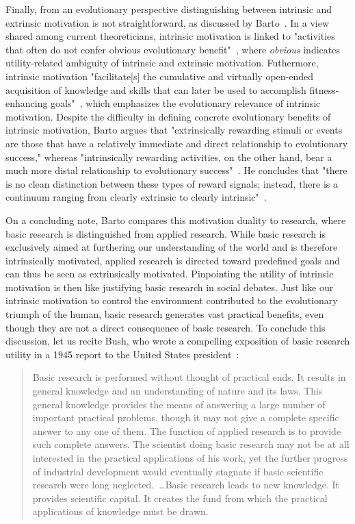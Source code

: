 \documentclass[a4paper]{scrreprt}
\begin{document}
Finally, from an evolutionary perspective distinguishing between intrinsic and extrinsic motivation is not straightforward, as discussed by Barto~\cite{barto13}. In a view shared among current theoreticians, intrinsic motivation is linked to "activities that often do not confer obvious evolutionary benefit"~\cite{baldassarre14}, where \textit{obvious} indicates utility-related ambiguity of intrinsic and extrinsic motivation. Futhermore, intrinsic motivation "facilitate[s] the cumulative and virtually open-ended acquisition of knowledge and skills that can later be used to accomplish fitness-enhancing goals"~\cite{baldassarre14}, which emphasizes the evolutionary relevance of intrinsic motivation. Despite the difficulty in defining concrete evolutionary benefits of intrinsic motivation, Barto argues that "extrinsically rewarding stimuli or events are those that have a relatively immediate and direct relationship to evolutionary success," whereas "intrinsically rewarding activities, on the other hand, bear a much more distal relationship to evolutionary success"~\cite{barto13}. He concludes that "there is no clean distinction between these types of reward signals; instead, there is a continuum ranging from clearly extrinsic to clearly intrinsic"~\cite{barto13}. 

On a concluding note, Barto compares this motivation duality to research, where basic research is distinguished from applied research. While basic research is exclusively aimed at furthering our understanding of the world and is therefore intrinsically motivated, applied research is directed toward predefined goals and can thus be seen as extrinsically motivated. Pinpointing the utility of intrinsic motivation is then like justifying basic research in social debates. Just like our intrinsic motivation to control the environment contributed to the evolutionary triumph of the human, basic research generates vast practical benefits, even though they are not a direct consequence of basic research. To conclude this discussion, let us recite Bush, who wrote a compelling exposition of basic research utility in a 1945 report to the United States president~\cite{bush45}:

\begin{quote}
Basic research is performed without thought of practical ends. It results in general knowledge and an understanding of nature and its laws. This general knowledge provides the means of answering a large number of important practical problems, though it may not give a complete specific answer to any one of them. The function of applied research is to provide such complete answers. The scientist doing basic research may not be at all interested in the practical applications of his work, yet the further progress of industrial development would eventually stagnate if basic scientific research were long neglected.~\dots Basic research leads to new knowledge. It provides scientific capital. It creates the fund from which the practical applications of knowledge must be drawn.
\end{quote}
\end{document}
